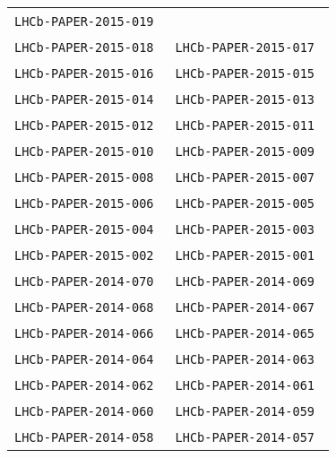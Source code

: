 \begin{center}
\begin{longtable}{ll}
\texttt{LHCb-PAPER-2015-019}~\cite{LHCb-PAPER-2015-019} \\
\texttt{LHCb-PAPER-2015-018}~\cite{LHCb-PAPER-2015-018} &
\texttt{LHCb-PAPER-2015-017}~\cite{LHCb-PAPER-2015-017} \\
\texttt{LHCb-PAPER-2015-016}~\cite{LHCb-PAPER-2015-016} &
\texttt{LHCb-PAPER-2015-015}~\cite{LHCb-PAPER-2015-015} \\
\texttt{LHCb-PAPER-2015-014}~\cite{LHCb-PAPER-2015-014} &
\texttt{LHCb-PAPER-2015-013}~\cite{LHCb-PAPER-2015-013} \\
\texttt{LHCb-PAPER-2015-012}~\cite{LHCb-PAPER-2015-012} &
\texttt{LHCb-PAPER-2015-011}~\cite{LHCb-PAPER-2015-011} \\
\texttt{LHCb-PAPER-2015-010}~\cite{LHCb-PAPER-2015-010} &
\texttt{LHCb-PAPER-2015-009}~\cite{LHCb-PAPER-2015-009} \\
\texttt{LHCb-PAPER-2015-008}~\cite{LHCb-PAPER-2015-008} &
\texttt{LHCb-PAPER-2015-007}~\cite{LHCb-PAPER-2015-007} \\
\texttt{LHCb-PAPER-2015-006}~\cite{LHCb-PAPER-2015-006} &
\texttt{LHCb-PAPER-2015-005}~\cite{LHCb-PAPER-2015-005} \\
\texttt{LHCb-PAPER-2015-004}~\cite{LHCb-PAPER-2015-004} &
\texttt{LHCb-PAPER-2015-003}~\cite{LHCb-PAPER-2015-003} \\
\texttt{LHCb-PAPER-2015-002}~\cite{LHCb-PAPER-2015-002} &
\texttt{LHCb-PAPER-2015-001}~\cite{LHCb-PAPER-2015-001} \\
\hline
\texttt{LHCb-PAPER-2014-070}~\cite{LHCb-PAPER-2014-070} &
\texttt{LHCb-PAPER-2014-069}~\cite{LHCb-PAPER-2014-069} \\
\texttt{LHCb-PAPER-2014-068}~\cite{LHCb-PAPER-2014-068} &
\texttt{LHCb-PAPER-2014-067}~\cite{LHCb-PAPER-2014-067} \\
\texttt{LHCb-PAPER-2014-066}~\cite{LHCb-PAPER-2014-066} &
\texttt{LHCb-PAPER-2014-065}~\cite{LHCb-PAPER-2014-065} \\
\texttt{LHCb-PAPER-2014-064}~\cite{LHCb-PAPER-2014-064} &
\texttt{LHCb-PAPER-2014-063}~\cite{LHCb-PAPER-2014-063} \\
\texttt{LHCb-PAPER-2014-062}~\cite{LHCb-PAPER-2014-062} &
\texttt{LHCb-PAPER-2014-061}~\cite{LHCb-PAPER-2014-061} \\
\texttt{LHCb-PAPER-2014-060}~\cite{LHCb-PAPER-2014-060} &
\texttt{LHCb-PAPER-2014-059}~\cite{LHCb-PAPER-2014-059} \\
\texttt{LHCb-PAPER-2014-058}~\cite{LHCb-PAPER-2014-058} &
\texttt{LHCb-PAPER-2014-057}~\cite{LHCb-PAPER-2014-057} \\

\end{longtable}
\end{center}
